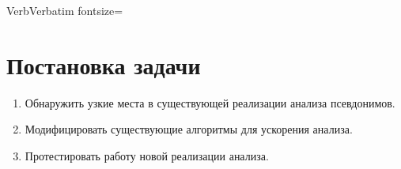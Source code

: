 

\usepackage {amsmath}      %
\usepackage {amssymb}
\usepackage {textcase}     %
\usepackage {indentfirst}  %

\usepackage {fancyvrb}     %
\DefineVerbatimEnvironment%
    {Verb}{Verbatim}
    {fontsize=\small}

\usepackage {graphicx}





\clearpage
\thispagestyle{empty}

\section*{Постановка задачи}

\begin{enumerate}
  \item Обнаружить узкие места в существующей реализации анализа псевдонимов.
  \item Модифицировать существующие алгоритмы для ускорения анализа.
  \item Протестировать работу новой реализации анализа.
\end{enumerate}

\clearpage
{}%

